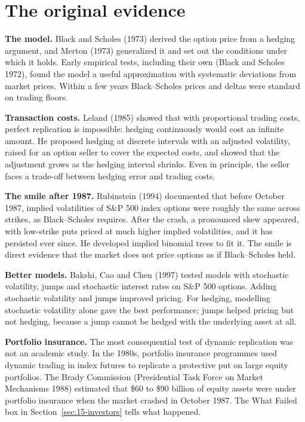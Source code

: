 \section{The original evidence}
\label{sec:15-evidence}

\textbf{The model.} Black and Scholes (1973) derived the option price from a hedging argument, and Merton (1973) generalized it and set out the conditions under which it holds. Early empirical tests, including their own (Black and Scholes 1972), found the model a useful approximation with systematic deviations from market prices. Within a few years Black--Scholes prices and deltas were standard on trading floors.

\textbf{Transaction costs.} Leland (1985) showed that with proportional trading costs, perfect replication is impossible: hedging continuously would cost an infinite amount. He proposed hedging at discrete intervals with an adjusted volatility, raised for an option seller to cover the expected costs, and showed that the adjustment grows as the hedging interval shrinks. Even in principle, the seller faces a trade-off between hedging error and trading costs.

\textbf{The smile after 1987.} Rubinstein (1994) documented that before October 1987, implied volatilities of S\&P 500 index options were roughly the same across strikes, as Black--Scholes requires. After the crash, a pronounced skew appeared, with low-strike puts priced at much higher implied volatilities, and it has persisted ever since. He developed implied binomial trees to fit it. The smile is direct evidence that the market does not price options as if Black--Scholes held.

\textbf{Better models.} Bakshi, Cao and Chen (1997) tested models with stochastic volatility, jumps and stochastic interest rates on S\&P 500 options. Adding stochastic volatility and jumps improved pricing. For hedging, modelling stochastic volatility alone gave the best performance; jumps helped pricing but not hedging, because a jump cannot be hedged with the underlying asset at all.

\textbf{Portfolio insurance.} The most consequential test of dynamic replication was not an academic study. In the 1980s, portfolio insurance programmes used dynamic trading in index futures to replicate a protective put on large equity portfolios. The Brady Commission (Presidential Task Force on Market Mechanisms 1988) estimated that \$60 to \$90 billion of equity assets were under portfolio insurance when the market crashed in October 1987. The What Failed box in Section~\ref{sec:15-investors} tells what happened.

